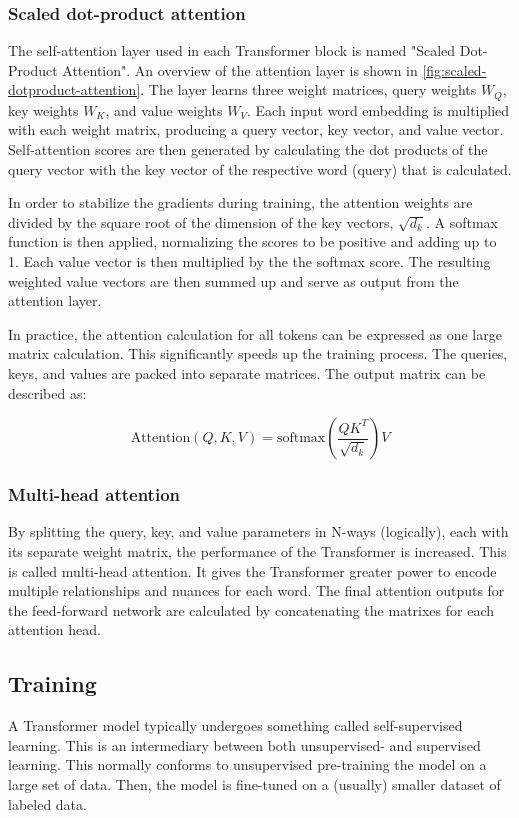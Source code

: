 \subsubsection{Scaled dot-product attention} 
\label{sec:scaled-dot-product-attention}
The self-attention layer used in each Transformer block is named "Scaled Dot-Product Attention". An overview of the attention layer is shown in \cref{fig:scaled-dotproduct-attention}. The layer learns three weight matrices, query weights \(W_Q\), key weights \(W_K\), and value weights \(W_V\). Each input word embedding is multiplied with each weight matrix, producing a query vector, key vector, and value vector. Self-attention scores are then generated by calculating the dot products of the query vector with the key vector of the respective word (query) that is calculated.

In order to stabilize the gradients during training, the attention weights are divided by the square root of the dimension of the key vectors, \(\sqrt{d_{k}}\). A softmax function is then applied, normalizing the scores to be positive and adding up to 1. Each value vector is then multiplied by the the softmax score. The resulting weighted value vectors are then summed up and serve as output from the attention layer.

In practice, the attention calculation for all tokens can be expressed as one large matrix calculation. This significantly speeds up the training process. The queries, keys, and values are packed into separate matrices. The output matrix can be described as:

\begin{equation}
    \text{Attention$(Q,K,V)$} = \text{softmax}(\frac{QK^T}{\sqrt{d_{k}}})V
\end{equation}


\subsubsection{Multi-head attention}
\label{sec:multi-head-attention}
By splitting the query, key, and value parameters in N-ways (logically), each with its separate weight matrix, the performance of the Transformer is increased. This is called multi-head attention. It gives the Transformer greater power to encode multiple relationships and nuances for each word. The final attention outputs for the feed-forward network are calculated by concatenating the matrixes for each attention head.

\subsection{Training}
\label{sec:training}
A Transformer model typically undergoes something called self-supervised learning. This is an intermediary between both unsupervised- and supervised learning. This normally conforms to unsupervised pre-training the model on a large set of data. Then, the model is fine-tuned on a (usually) smaller dataset of labeled data.

